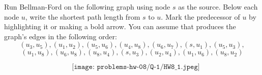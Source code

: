 \begin{prob}
Run Bellman-Ford on the following graph using node $s$ as the source.
Below each node $u$, write the shortest path length from $s$ to $u$.
    Mark the predecessor of $u$ by highlighting it or making a bold arrow.
    You can assume that  produces the graph's edges in the following
    order:
    \[(u_3, u_5), (u_1, u_2), (u_5, u_6), (u_4, u_8), (u_6, u_7), (s, u_1), (u_5, u_3),\] \[(u_1, u_8), (u_6, u_8), (u_8, u_4), (s, u_3), (u_2, u_4), (u_1, u_6), (u_8, u_2) \]
    
    $$
        \hspace{1em}\texttt{[image: problems-hw-08/Q-1/HW8\_1.jpeg]}
    $$

    \begin{soln}
    
     
    \end{soln}
    
\end{prob}